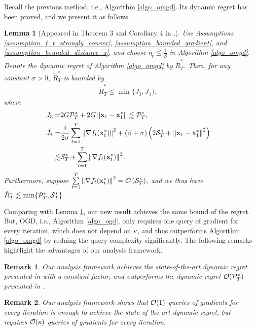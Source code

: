 \documentclass{article}
\newtheorem{Lemma}{\bf{Lemma}}
\newtheorem{Remark}{\bf{Remark}}
\begin{document}
Recall the previous method, i.e., Algorithm \ref{algo_omgd}. Its dynamic regret has been proved, and we present it as follows.
\begin{Lemma}[Appeared in Theorem $3$ and Corollary $4$ in \cite{Zhang:2016wl}.]
\label{lemma_previous_result_sc_regret}
Use Assumptions \ref{assumption_f_t_strongly_convex}, \ref{assumption_bounded_gradient}, and \ref{assumption_bounded_distance_x}, and choose $\eta_t \le \frac{1}{\beta}$ in Algorithm \ref{algo_omgd}. Denote the dynamic regret of Algorithm \ref{algo_omgd} by $\tilde{R}_T^{\ast}$. Then, for any constant $\sigma>0$, $\tilde{R}_T^{\ast}$ is bounded by 
\begin{align}
\nonumber
\tilde{R}_T^{\ast} \le \min\{J_3, J_4\},
\end{align} where 
\begin{align}
\nonumber
J_3 = & 2G {\mathcal{P}}_T^{\ast} + 2G \left\lVert{\bf x}_1 - {\bf x}_1^\ast\right\rVert \lesssim {\mathcal{P}}_T^{\ast}, \\ \nonumber
J_4 = & \frac{1}{2\sigma} \sum_{t=1}^T \left\lVert\nabla f_t({\bf x}_t^\ast)\right\rVert^2 +(\beta + \sigma) \left(  2{\mathcal{S}}_T^{\ast}  +  \left\lVert{\bf x}_1 - {\bf x}_1^\ast\right\rVert^2  \right) \\ \nonumber
\lesssim & {\mathcal{S}}_T^{\ast} + \sum_{t=1}^T \left\lVert\nabla f_t({\bf x}_t^\ast)\right\rVert^2.
\end{align} Furthermore, suppose $\sum\limits_{t=1}^{T} \left\lVert\nabla f_t({\bf x}_t^{\ast})\right\rVert^2 = {\mathcal{O}} \left( {\mathcal{S}}_T^{\ast} \right) $, and we thus have $\tilde{R}_T^{\ast} \lesssim  \min \{ {\mathcal{P}}_T^{\ast}, {\mathcal{S}}_T^{\ast} \}$.
\end{Lemma}

Comparing with Lemma \ref{lemma_previous_result_sc_regret}, our new result achieves the same bound of the regret. But, OGD, i.e., Algorithm \ref{algo_ogd}, only requires one query of gradient for every iteration, which does not depend on $\kappa$, and thus outperforms Algorithm \ref{algo_omgd} by reduing the query complexity significantly. The following remarks hightlight the advantages of our analysis framework.
\begin{Remark}
Our analysis framework achieves the state-of-the-art dynamic regret presented in \cite{Zhang:2016wl} with a constant factor, and outperforms the dynamic regret ${\mathcal{O}}({\mathcal{P}}_T^{\ast})$ presented in \cite{Mokhtari:2016jz}. 
\end{Remark}
\begin{Remark}
Our analysis framework shows that ${\mathcal{O}}(1)$ queries of gradients for every iteration is enough to achieve the state-of-the-art dynamic regret, but \cite{Zhang:2016wl} requires ${\mathcal{O}}(\kappa)$ queries of gradients for every iteration.
\end{Remark}
\end{document}
